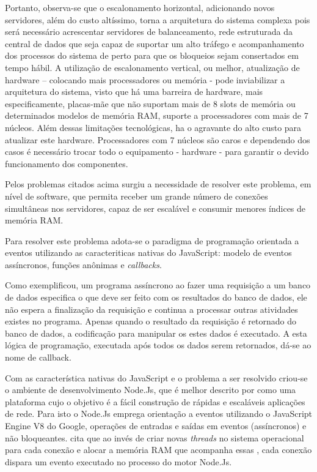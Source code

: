   Portanto, observa-se que o escalonamento horizontal, adicionando novos servidores, além do custo altíssimo, 
  torna a arquitetura do sistema complexa pois será necessário acrescentar servidores de balanceamento, 
  rede estruturada da central de dados que seja capaz de suportar um alto tráfego e acompanhamento dos processos 
  do sistema de perto para que os bloqueios sejam consertados em tempo hábil. A utilização de escalonamento vertical, 
  ou melhor, atualização de hardware – colocando mais processadores ou memória - pode inviabilizar a arquitetura do 
  sistema, visto que há uma barreira de hardware, mais especificamente, placas-mãe que não suportam mais de 8 slots 
  de memória ou determinados modelos de memória RAM, suporte a processadores com mais de 7 núcleos. 
  Além dessas limitações tecnológicas, ha o agravante do alto custo para atualizar este hardware. 
  Processadores com 7 núcleos são caros e dependendo dos casos é necessário trocar todo o equipamento - hardware - 
  para garantir o devido funcionamento dos componentes.
  
  Pelos problemas citados acima surgiu a necessidade de resolver este problema, 
  em nível de software, que permita receber um grande número de conexões simultâneas 
  nos servidores, capaz de ser escalável e consumir menores índices de memória RAM.
  
  Para resolver este problema adota-se o paradigma de programação orientada a eventos utilizando
  as caracteriticas nativas do JavaScript: modelo de eventos assíncronos, funções anônimas e \textit{callbacks}. \cite{Junior:2012}
  
  Como  exemplificou, um programa assíncrono ao fazer uma requisição 
  a um banco de dados especifica o que deve ser feito com os resultados do banco de dados, ele não espera a 
  finalização da requisição e continua a processar outras atividades existes no programa. 
  Apenas quando o resultado da requisição é retornado do banco de dados, a codificação para manipular os estes dados 
  é executado. A esta lógica de programação, executada após todos os dados serem retornados, dá-se ao nome de callback.\cite[p. 2]{Junior:2012} 
  
  Com as característica nativas do JavaScript e o problema a ser resolvido criou-se o ambiente de desenvolvimento Node.Js, 
  que é melhor descrito por  como uma plataforma cujo o objetivo é a fácil 
  construção de rápidas e escaláveis aplicações de rede. Para isto o Node.Js emprega orientação 
  a eventos utilizando o JavaScript Engine V8 do Google, operações de entradas e saídas em eventos (assíncronos) 
  e não bloqueantes.  cita que ao invés de criar novas \textit{threads}
  no sistema operacional para cada conexão e alocar a memória RAM que acompanha essas , 
  cada conexão dispara um evento executado no processo do motor Node.Js. 
  
